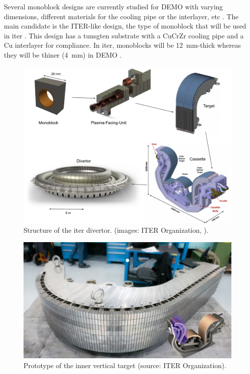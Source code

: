 Several \gls{monoblock} designs are currently studied for DEMO with varying dimensions, different materials for the cooling pipe or the interlayer, etc .
The main candidate is the ITER-like design, the type of \gls{monoblock} that will be used in \acrshort{iter} \cite{hirai_use_2016}.
This design has a tunsgten substrate with a CuCrZr cooling pipe and a Cu interlayer for compliance.
In \acrshort{iter}, \glspl{monoblock} will be \SI{12}{mm}-thick whereas they will be thiner (\SI{4}{mm}) in DEMO .

\begin{figure}
    \includegraphics[width=\linewidth]{Figures/Chapter1/monoblock_to_divertor.pdf}
    \caption{Structure of the \acrshort{iter} divertor. (images: ITER Organization, \cite{guerrini_fabrication_2021}).}
\end{figure}

\begin{figure} [h]
    \centering
    \includegraphics[width=0.8\linewidth]{Figures/Chapter1/inner_target_iter.jpg}
    \caption{Prototype of the inner vertical target (source: ITER Organization).}
\end{figure}

